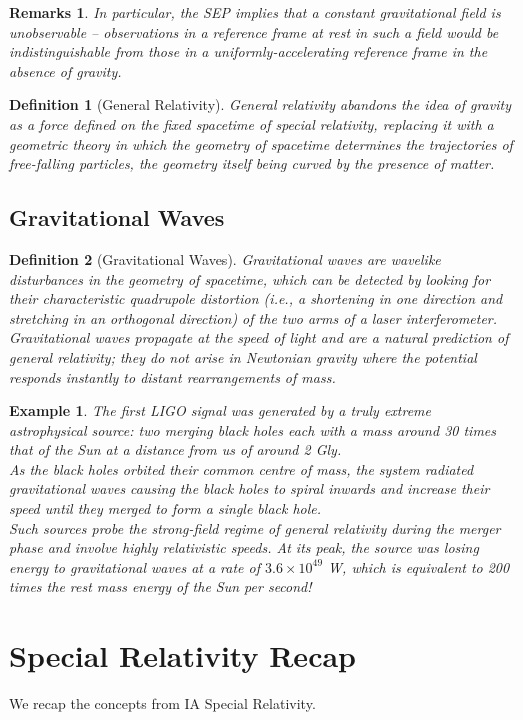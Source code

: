 \documentclass[a4paper]{article}
\newtheorem{defi}{Definition}[section]
\newtheorem{remarks}{Remarks}[section]
\newtheorem{eg}{Example}[section]
\theoremstyle{new}
\begin{document}
\begin{remarks}
In particular, the SEP implies that a constant gravitational field is unobservable – observations in a reference frame at rest in such a field would be indistinguishable from those in a uniformly-accelerating reference frame in the absence of gravity.
\end{remarks}
\begin{defi}[General Relativity]
General relativity abandons the idea of gravity as a force defined on the fixed spacetime of special relativity, replacing it with a geometric theory in which the geometry of spacetime determines the trajectories of free-falling particles, the geometry itself being curved by the presence of matter.
\end{defi}
\subsection{Gravitational Waves}
\begin{defi}[Gravitational Waves]
Gravitational waves are wavelike disturbances in the geometry of spacetime, which can be detected by looking for their characteristic quadrupole distortion (i.e., a shortening in one direction and stretching in an orthogonal direction) of the two arms of a laser interferometer.\\[5pt]
Gravitational waves propagate at the speed of light and are a natural prediction of general relativity; they do not arise in Newtonian gravity where the potential responds instantly to distant rearrangements of mass.
\end{defi}
\begin{eg}
The first LIGO signal was generated by a truly extreme astrophysical source: two merging black holes each with a mass around 30 times that of the Sun at a distance from us of around 2 Gly.\\[5pt]
As the black holes orbited their common centre of mass, the system radiated gravitational waves causing the black holes to spiral inwards and increase their speed until they merged to form a single black hole.\\[5pt]
Such sources probe the strong-field regime of general relativity during the merger phase and involve highly relativistic speeds. At its peak, the source was losing energy to gravitational waves at a rate of $3.6\times10^{49}$ W, which is equivalent to 200 times the rest mass energy of the Sun per second!
\end{eg}
\newpage
\section{Special Relativity Recap}
We recap the concepts from IA Special Relativity.
\end{document}

